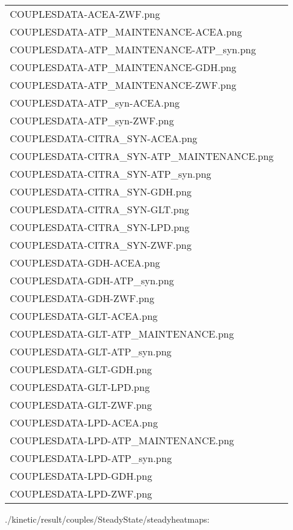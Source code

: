 \documentclass[a4paper, parskip=full]{scrreprt}
\begin{document}
\begin{longtable}{ll}
COUPLESDATA-ACEA-ZWF.png\\
COUPLESDATA-ATP\_MAINTENANCE-ACEA.png\\
COUPLESDATA-ATP\_MAINTENANCE-ATP\_syn.png\\
COUPLESDATA-ATP\_MAINTENANCE-GDH.png\\
COUPLESDATA-ATP\_MAINTENANCE-ZWF.png\\
COUPLESDATA-ATP\_syn-ACEA.png\\
COUPLESDATA-ATP\_syn-ZWF.png\\
COUPLESDATA-CITRA\_SYN-ACEA.png\\
COUPLESDATA-CITRA\_SYN-ATP\_MAINTENANCE.png\\
COUPLESDATA-CITRA\_SYN-ATP\_syn.png\\
COUPLESDATA-CITRA\_SYN-GDH.png\\
COUPLESDATA-CITRA\_SYN-GLT.png\\
COUPLESDATA-CITRA\_SYN-LPD.png\\
COUPLESDATA-CITRA\_SYN-ZWF.png\\
COUPLESDATA-GDH-ACEA.png\\
COUPLESDATA-GDH-ATP\_syn.png\\
COUPLESDATA-GDH-ZWF.png\\
COUPLESDATA-GLT-ACEA.png\\
COUPLESDATA-GLT-ATP\_MAINTENANCE.png\\
COUPLESDATA-GLT-ATP\_syn.png\\
COUPLESDATA-GLT-GDH.png\\
COUPLESDATA-GLT-LPD.png\\
COUPLESDATA-GLT-ZWF.png\\
COUPLESDATA-LPD-ACEA.png\\
COUPLESDATA-LPD-ATP\_MAINTENANCE.png\\
COUPLESDATA-LPD-ATP\_syn.png\\
COUPLESDATA-LPD-GDH.png\\
COUPLESDATA-LPD-ZWF.png
\end{longtable}

./kinetic/result/couples/SteadyState/steadyheatmaps:
\end{document}
